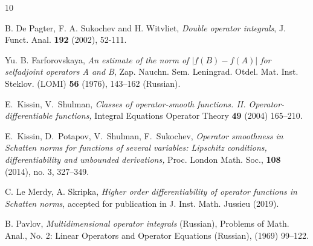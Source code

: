 \documentclass[12pt]{amsart}
\theoremstyle{remark}
\begin{document}
\begin{thebibliography}{10}


 B. De Pagter, F. A. Sukochev and H. Witvliet,
{\it Double operator integrals},
J. Funct. Anal. \textbf{192} (2002), 52-111.


 Yu. B. Farforovskaya, \textit{An estimate of the norm of $|f(B)-f(A)|$ for selfadjoint operators A and B}, Zap. Nauchn. Sem. Leningrad. Otdel. Mat. Inst. Steklov. (LOMI) \textbf{56} (1976), 143–162 (Russian).



E.~Kissin, V.~Shulman,
{\it Classes of operator-smooth functions. II. Operator-differentiable functions,} Integral Equations Operator Theory \textbf{49} (2004) 165–210.


E.~Kissin, D.~Potapov, V.~Shulman, F.~Sukochev,
{\it Operator smoothness in Schatten norms for functions of several variables:
Lipschitz conditions, differentiability and unbounded derivations,} Proc. London Math. Soc., {\bf 108} (2014), no. 3, 327--349.






 C. Le Merdy, A. Skripka, {\it Higher order differentiability of operator functions in Schatten norms}, accepted for publication in J. Inst. Math. Jussieu (2019).




 B. Pavlov,
{\it Multidimensional operator integrals}
(Russian), Problems of Math. Anal., No. 2:
Linear Operators and Operator Equations (Russian),
(1969) 99--122.



\end{thebibliography}
\end{document}
